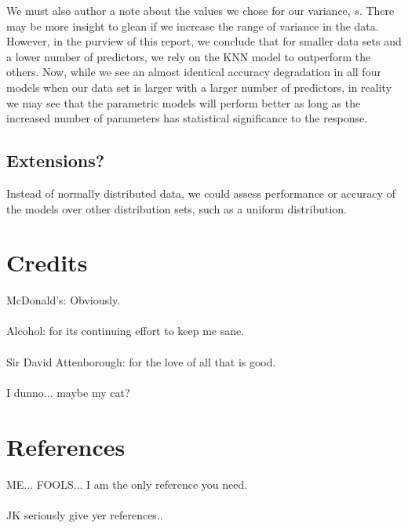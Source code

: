 \documentclass[11pt, oneside]{article}
\begin{document}
We must also author a note about the values we chose for our variance, $s$. There may be more insight to glean if we increase the range of variance in the data. However, in the purview of this report, we conclude that for smaller data sets and a lower number of predictors, we rely on the KNN model to outperform the others. Now, while we see an almost identical accuracy degradation in all four models when our data set is larger with a larger number of predictors, in reality we may see that the parametric models will perform better as long as the increased number of parameters has statistical significance to the response.\\





\vspace{3.0cm}
\subsection*{Extensions?}
 Instead of normally distributed data, we could assess performance or accuracy of the models over other distribution sets, such as a uniform distribution.
 
\pagebreak
\section{Credits}
McDonald's: Obviously.\\
\\
Alcohol: for its continuing effort to keep me sane.\\
\\
Sir David Attenborough: for the love of all that is good.\\
\\
I dunno... maybe my cat?


\section*{References}
ME... FOOLS... I am the only reference you need.\\
\\
JK seriously give yer references..
\end{document}
